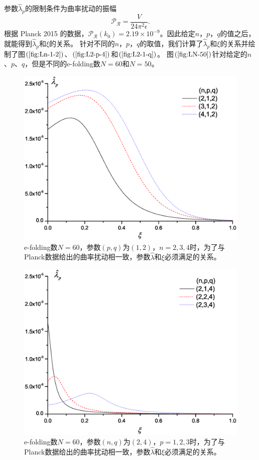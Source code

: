 参数$\hat{\lambda}_{p}$的限制条件为曲率扰动的振幅
\begin{equation}
  \label{eq:amplitude-of-curvature-perturbation-by-Planck}
  \mathcal{P}_{\mathcal{R}} = \frac{V}{24\pi^2\epsilon}.
\end{equation}
根据 Planck 2015 的数据，$\mathcal{P}_{\mathcal{R}}(k_0)=2.19\times
10^{-9}$。因此给定$n$，$p$，$q$的值之后，就能得到$\hat{\lambda}_{p}$和$\xi$的关系。
针对不同的$n$，$p$，$q$的取值，我们计算了$\hat{\lambda}_{p}$和$\xi$的关系并绘制了图$(\ref{fig:Ln-1-2})$、$(\ref{fig:L2-p-4})$和$(\ref{fig:L2-1-q})$。
图$(\ref{fig:LN-50})$针对给定的$n$、$p$、$q$，但是不同的e-folding数$N=60$和$N=50$。

\begin{figure}
  \centering
  \includegraphics[width=5in]{Img/Ln,1,2.eps}
  \caption{e-folding数$N=60$，参数$(p,q)$为$(1,
  2)$，$n=2,3,4$时，为了与Planck数据给出的曲率扰动相一致，参数$\hat{\lambda}$和$\xi$必须满足的关系。}\label{fig:Ln-1-2}
\end{figure}

\begin{figure}\small
  \centering
  \includegraphics[width=5in]{Img/L2,p,4.eps}
  \caption{e-folding数$N=60$，参数$(n,q)$为$(2,
  4)$，$p=1,2,3$时，为了与Planck数据给出的曲率扰动相一致，参数$\hat{\lambda}$和$\xi$必须满足的关系。}\label{fig:L2-p-4}
\end{figure}

